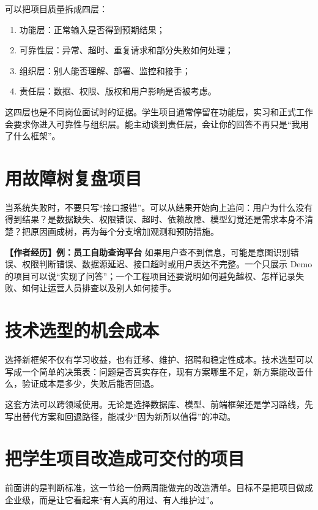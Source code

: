 \documentclass[UTF8,zihao=5,openany]{ctexbook}
\begin{document}
可以把项目质量拆成四层：
\begin{enumerate}
\item 功能层：正常输入是否得到预期结果；
\item 可靠性层：异常、超时、重复请求和部分失败如何处理；
\item 组织层：别人能否理解、部署、监控和接手；
\item 责任层：数据、权限、版权和用户影响是否被考虑。
\end{enumerate}

这四层也是不同岗位面试时的证据。学生项目通常停留在功能层，实习和正式工作会要求你进入可靠性与组织层。能主动谈到责任层，会让你的回答不再只是“我用了什么框架”。

\section{用故障树复盘项目}
当系统失败时，不要只写“接口报错”。可以从结果开始向上追问：用户为什么没有得到结果？是数据缺失、权限错误、超时、依赖故障、模型幻觉还是需求本身不清楚？把原因画成树，再为每个分支增加观测和预防措施。

\begin{casebox}
\textbf{【作者经历】例：员工自助查询平台}
如果用户查不到信息，可能是意图识别错误、权限判断错误、数据源延迟、接口超时或用户表达不完整。一个只展示 Demo 的项目可以说“实现了问答”；一个工程项目还要说明如何避免越权、怎样记录失败、如何让运营人员排查以及别人如何接手。
\end{casebox}

\section{技术选型的机会成本}
选择新框架不仅有学习收益，也有迁移、维护、招聘和稳定性成本。技术选型可以写成一个简单的决策表：问题是否真实存在，现有方案哪里不足，新方案能改善什么，验证成本是多少，失败后能否回退。

这套方法可以跨领域使用。无论是选择数据库、模型、前端框架还是学习路线，先写出替代方案和回退路径，能减少“因为新所以值得”的冲动。

\section{把学生项目改造成可交付的项目}
前面讲的是判断标准，这一节给一份两周能做完的改造清单。目标不是把项目做成企业级，而是让它看起来“有人真的用过、有人维护过”。
\end{document}
